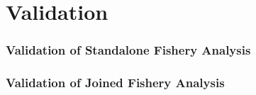 % 
%  
%
\chapter{Validation}
\label{cha:validation}


\subsection{Validation of Standalone Fishery Analysis} %
\label{sec:val_SFA}




\subsection{Validation of Joined Fishery Analysis} %
\label{sub:val_JFA}







